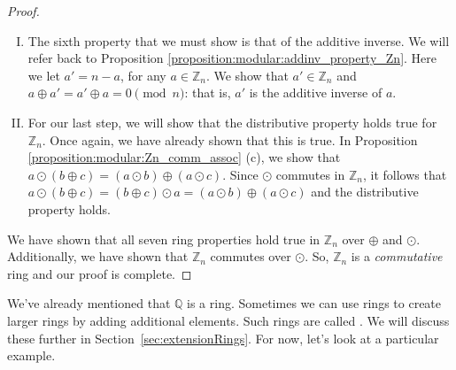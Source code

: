 \begin{example}
\begin{proof}
\begin{enumerate}[(I)]
$a \odot b    =  b \odot a$, for all $a,b\in{\mathbb Z}_n$.  Note that for a set to be a ring, we only need to show that commutativity of \emph{addition} holds.  Because commutativity of \emph{multiplication} also holds for ${\mathbb Z}_n$, we may also have a \emph{commutative} ring.  Let's continue with our proof that ${\mathbb Z}_n$ is a ring before we jump to that conclusion.
\item The sixth property that we must show is that of the additive inverse.  We will refer back to Proposition \ref{proposition:modular:addinv_property_Zn}.  Here we let $a' = n-a$, for any $a\in{\mathbb Z}_n$.  We show that $a'\in{\mathbb Z}_n$ and $a \oplus a' = a' \oplus a  = 0 \pmod{ n}$: that is, $a'$ is the additive inverse of $a$.
\item For our last step, we will show that the distributive property holds true for ${\mathbb Z}_n$. Once again, we have already shown that this is true.  In Proposition \ref{proposition:modular:Zn_comm_assoc} (c), we show that $a \odot (b \oplus c)  = (a \odot b)\oplus (a \odot c)$.  Since $\odot$ commutes in ${\mathbb Z}_n$, it follows that $a \odot (b \oplus c)  = (b \oplus c) \odot a= (a \odot b)\oplus (a \odot c)$ and the distributive property holds.
\end{enumerate}
We have shown that all seven ring properties hold true in ${\mathbb Z}_n$ over $\oplus$ and $\odot$. Additionally, we have shown that ${\mathbb Z}_n$ commutes over $\odot$.  So, ${\mathbb Z}_n$ is a \emph{commutative} ring and our proof is complete.
\end{proof}
\end{example}

We've already mentioned that ${\mathbb Q}$ is a ring. Sometimes we can use rings to create larger rings by adding additional elements. Such rings are called . We will discuss these further in Section~\ref{sec:extensionRings}. For now, let's look at a particular example.

